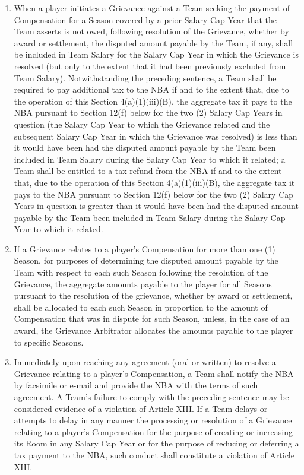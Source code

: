 \documentclass[
]{book}
\begin{document}
\begin{enumerate}
\begin{enumerate}
\begin{enumerate}
\begin{enumerate}
\begin{enumerate}
        \end{enumerate}
      \item
        When a player initiates a Grievance against a Team seeking the payment of Compensation for a Season covered by a prior Salary Cap Year that the Team asserts is not owed, following resolution of the Grievance, whether by award or settlement, the disputed amount payable by the Team, if any, shall be included in Team Salary for the Salary Cap Year in which the Grievance is resolved (but only to the extent that it had been previously excluded from Team Salary). Notwithstanding the preceding sentence, a Team shall be required to pay additional tax to the NBA if and to the extent that, due to the operation of this Section 4(a)(1)(iii)(B), the aggregate tax it pays to the NBA pursuant to Section 12(f) below for the two (2) Salary Cap Years in question (the Salary Cap Year to which the Grievance related and the subsequent Salary Cap Year in which the Grievance was resolved) is less than it would have been had the disputed amount payable by the Team been included in Team Salary during the Salary Cap Year to which it related; a Team shall be entitled to a tax refund from the NBA if and to the extent that, due to the operation of this Section 4(a)(1)(iii)(B), the aggregate tax it pays to the NBA pursuant to Section 12(f) below for the two (2) Salary Cap Years in question is greater than it would have been had the disputed amount payable by the Team been included in Team Salary during the Salary Cap Year to which it related.
      \item
        If a Grievance relates to a player's Compensation for more than one (1) Season, for purposes of determining the disputed amount payable by the Team with respect to each such Season following the resolution of the Grievance, the aggregate amounts payable to the player for all Seasons pursuant to the resolution of the grievance, whether by award or settlement, shall be allocated to each such Season in proportion to the amount of Compensation that was in dispute for such Season, unless, in the case of an award, the Grievance Arbitrator allocates the amounts payable to the player to specific Seasons.
      \item
        Immediately upon reaching any agreement (oral or written) to resolve a Grievance relating to a player's Compensation, a Team shall notify the NBA by facsimile or e-mail and provide the NBA with the terms of such agreement. A Team's failure to comply with the preceding sentence may be considered evidence of a violation of Article XIII. If a Team delays or attempts to delay in any manner the processing or resolution of a Grievance relating to a player's Compensation for the purpose of creating or increasing its Room in any Salary Cap Year or for the purpose of reducing or deferring a tax payment to the NBA, such conduct shall constitute a violation of Article XIII.

\end{enumerate}
\end{enumerate}
\end{enumerate}
\end{enumerate}
\end{document}
